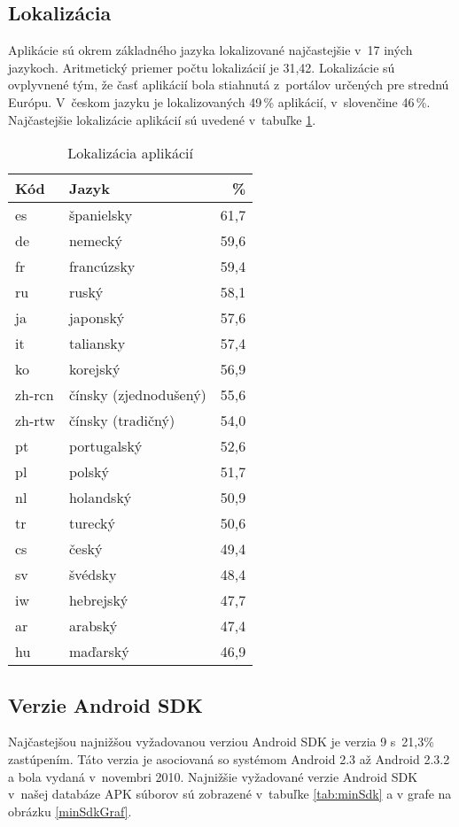 \subsection{Lokalizácia}
Aplikácie sú okrem základného jazyka lokalizované najčastejšie v~17 iných jazykoch. Aritmetický priemer počtu lokalizácií je 31,42. Lokalizácie sú ovplyvnené tým, že časť aplikácií bola stiahnutá z~portálov určených pre strednú Európu. V~českom jazyku je lokalizovaných 49\,\% aplikácií, v~slovenčine 46\,\%. Najčastejšie lokalizácie aplikácií sú uvedené v~tabuľke \ref{tab:language}.
\begin{table}[htb]
\centering
  \begin{tabular}{|l l r|}
    \hline
    \textbf{Kód} & \textbf{Jazyk} &  \textbf{\%} \\\hline\hline
    es & španielsky & 61,7 \\
    de & nemecký & 59,6 \\
    fr & francúzsky & 59,4 \\
    ru & ruský & 58,1 \\
    ja & japonský & 57,6 \\
    it & taliansky & 57,4 \\
	ko & korejský & 56,9 \\
	zh-rcn & čínsky (zjednodušený) & 55,6\\
	zh-rtw & čínsky (tradičný)& 54,0\\
	pt & portugalský & 52,6\\
	pl & polský & 51,7\\
	nl & holandský & 50,9\\
	tr & turecký & 50,6\\
	cs & český & 49,4\\
	sv & švédsky & 48,4\\
	iw & hebrejský & 47,7\\
	ar & arabský & 47,4\\
	hu & maďarský & 46,9\\
    \hline
  \end{tabular}
  \caption{Lokalizácia aplikácií}
  \label{tab:language}
\end{table}

\subsection{Verzie Android SDK}

Najčastejšou najnižšou vyžadovanou verziou Android SDK je verzia 9 s~21,3\% zastúpením. Táto verzia je asociovaná so systémom Android 2.3 až Android 2.3.2  a bola vydaná v~novembri 2010. Najnižšie vyžadované verzie Android SDK v~našej databáze APK súborov sú zobrazené v~tabuľke \ref{tab:minSdk} a v grafe na obrázku \ref{minSdkGraf}.

